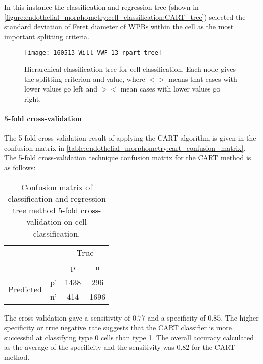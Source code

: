 In this instance the classification and regression tree (shown in \autoref{figure:endothelial_morphometry:cell_classification:CART_tree}) selected the standard deviation of Feret diameter of WPBs within the cell as the most important splitting criteria.

\begin{figure}[htbp!]
	\centering
	\texttt{[image: 160513\_Will\_VWF\_13\_rpart\_tree]}
	\caption[CART hierarchical tree]{Hierarchical classification tree for cell classification. Each node gives the splitting criterion and value, where $<>$ means that cases with lower values go left and $><$ mean cases with lower values go right.}
	\label{figure:endothelial_morphometry:cell_classification:CART_tree}
\end{figure}

\paragraph{5-fold cross-validation}
The 5-fold cross-validation result of applying the CART algorithm is given in the confusion matrix in \autoref{table:endothelial_morphometry:cart_confusion_matrix}.
The 5-fold cross-validation technique confusion matrix for the CART method is as follows:

\begin{table}[htbp]
\caption[Confusion matrix of CART cross-validation on cell classification]{Confusion matrix of classification and regression tree method 5-fold cross-validation on cell classification.}
\label{table:endothelial_morphometry:cart_confusion_matrix}
\centering
\begin{tabular}{cc|cc}
	\multicolumn{2}{c}{}&\multicolumn{2}{c}{True}\\
	\multicolumn{2}{c|}{}& p & n\\
	\cline{2-4}
	\multirow{2}{*}{Predicted}& p' & 1438 & 296\\ & n' & 414 & 1696\\
\end{tabular}
\end{table}

The cross-validation gave a sensitivity of $0.77$ and a specificity of $0.85$. The higher specificity or true negative rate suggests that the CART classifier is more successful at classifying type 0 cells than type 1. The overall accuracy calculated as the average of the specificity and the sensitivity was $0.82$ for the CART method.

